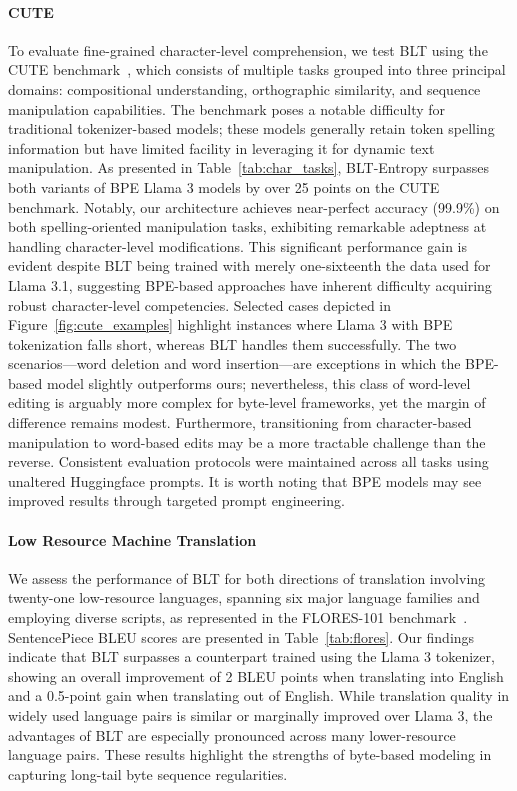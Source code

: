 \paragraph{CUTE}
To evaluate fine-grained character-level comprehension, we test {\textsc BLT} using the CUTE benchmark~\citep{edman2024cute}, which consists of multiple tasks grouped into three principal domains: compositional understanding, orthographic similarity, and sequence manipulation capabilities. The benchmark poses a notable difficulty for traditional tokenizer-based models; these models generally retain token spelling information but have limited facility in leveraging it for dynamic text manipulation. As presented in Table~\ref{tab:char_tasks}, {\textsc BLT}-Entropy surpasses both variants of BPE Llama 3 models by over 25 points on the CUTE benchmark. Notably, our architecture achieves near-perfect accuracy (99.9\%) on both spelling-oriented manipulation tasks, exhibiting remarkable adeptness at handling character-level modifications. This significant performance gain is evident despite {\textsc BLT} being trained with merely one-sixteenth the data used for Llama 3.1, suggesting BPE-based approaches have inherent difficulty acquiring robust character-level competencies. Selected cases depicted in Figure~\ref{fig:cute_examples} highlight instances where Llama 3 with BPE tokenization falls short, whereas {\textsc BLT} handles them successfully. The two scenarios—word deletion and word insertion—are exceptions in which the BPE-based model slightly outperforms ours; nevertheless, this class of word-level editing is arguably more complex for byte-level frameworks, yet the margin of difference remains modest. Furthermore, transitioning from character-based manipulation to word-based edits may be a more tractable challenge than the reverse. Consistent evaluation protocols were maintained across all tasks using unaltered Huggingface prompts. It is worth noting that BPE models may see improved results through targeted prompt engineering.

\paragraph{Low Resource Machine Translation} We assess the performance of {\textsc BLT} for both directions of translation involving twenty-one low-resource languages, spanning six major language families and employing diverse scripts, as represented in the FLORES-101 benchmark~\citep{goyal2022flores}. SentencePiece BLEU scores are presented in Table~\ref{tab:flores}. Our findings indicate that {\textsc BLT} surpasses a counterpart trained using the Llama 3 tokenizer, showing an overall improvement of 2 BLEU points when translating into English and a 0.5-point gain when translating out of English. While translation quality in widely used language pairs is similar or marginally improved over Llama 3, the advantages of {\textsc BLT} are especially pronounced across many lower-resource language pairs. These results highlight the strengths of byte-based modeling in capturing long-tail byte sequence regularities.

